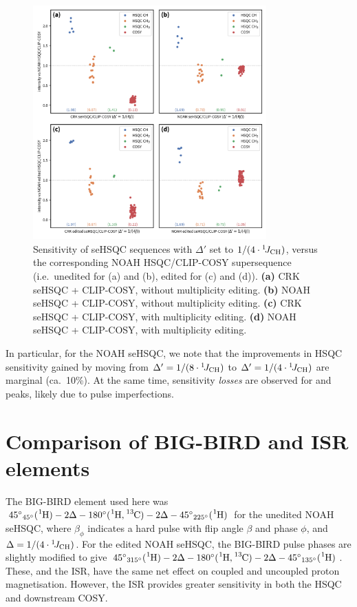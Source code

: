 \begin{figure}
    \centering
    \includegraphics[width=0.8\textwidth]{./figures/combined_1_4j.png}
    \caption{
        Sensitivity of seHSQC sequences with $\Delta'$ set to $1/(4\cdot\onejch)$, versus the corresponding NOAH HSQC/CLIP-COSY supersequence (i.e.\ unedited for (a) and (b), edited for (c) and (d)).
        \andro{}
        \textbf{(a)} CRK seHSQC + CLIP-COSY, without multiplicity editing.
        \textbf{(b)} NOAH seHSQC + CLIP-COSY, without multiplicity editing.
        \textbf{(c)} CRK seHSQC + CLIP-COSY, with multiplicity editing.
        \textbf{(d)} NOAH seHSQC + CLIP-COSY, with multiplicity editing.
    }
    \label{fig:combined_1_4j}
\end{figure}

In particular, for the NOAH seHSQC, we note that the improvements in HSQC  sensitivity gained by moving from $\Delta' = 1/(8\cdot\onejch)$ to $\Delta' = 1/(4\cdot\onejch)$ are marginal (ca.\ 10\%).
At the same time, sensitivity \textit{losses} are observed for  and  peaks, likely due to pulse imperfections.

\section{Comparison of BIG-BIRD and ISR elements}

The BIG-BIRD element used here was ${45^\circ}_{45^\circ}(\proton{}) - 2\Delta - 180^\circ(\proton{},\carbon{}) - 2\Delta - {45^\circ}_{225^\circ}(\proton{})$ for the unedited NOAH seHSQC, where $\beta_\phi$ indicates a hard pulse with flip angle $\beta$ and phase $\phi$, and $\Delta = 1/(4\cdot\onejch)$.
For the edited NOAH seHSQC, the BIG-BIRD pulse phases are slightly modified to give ${45^\circ}_{315^\circ}(\proton{}) - 2\Delta - 180^\circ(\proton{},\carbon{}) - 2\Delta - {45^\circ}_{135^\circ}(\proton{})$.
These, and the ISR, have the same net effect on coupled and uncoupled proton magnetisation.
However, the ISR provides greater sensitivity in both the HSQC and downstream COSY.

